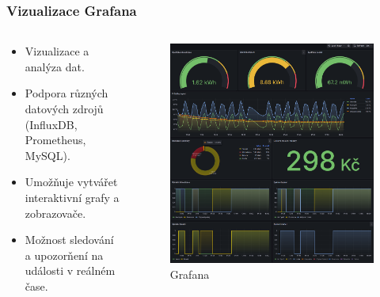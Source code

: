 \documentclass[%
  12pt,       				%
	t,                  %
	aspectratio=1610,   %
	unicode,						%
]{beamer}				    	%
\begin{document}
\begin{frame} 
	\frametitle{Vizualizace Grafana}
	\begin{columns}
		\begin{column}{0.6\textwidth}
	\begin{itemize}
		\item Vizualizace a analýza dat.
		\item Podpora různých datových zdrojů (InfluxDB, Prometheus, MySQL).
		\item Umožňuje vytvářet interaktivní grafy a zobrazovače.
		\item Možnost sledování a upozorňení na události v reálném čase.
	\end{itemize}
		\end{column}
		\begin{column}{0.4\textwidth}
			\begin{figure} [!ht]	
				\centering              %
				\includegraphics[width=0.9\columnwidth]{obrazky/Grafana.png}
				\caption{Grafana}
			\end{figure}	
		\end{column}
	\end{columns}
\end{frame}									%
\end{document}
